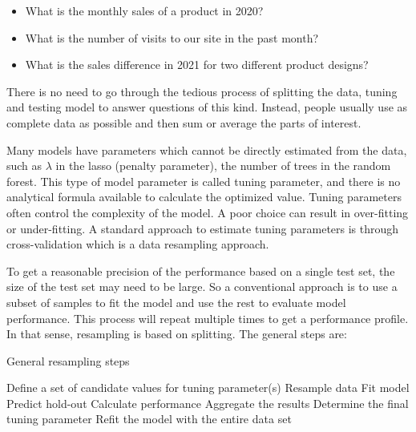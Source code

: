 \documentclass[
  12pt,
]{krantz}
\providecommand{\tightlist}{%
  \setlength{\itemsep}{0pt}\setlength{\parskip}{0pt}}
\begin{document}
\begin{itemize}
\tightlist
\item
  What is the monthly sales of a product in 2020?
\item
  What is the number of visits to our site in the past month?
\item
  What is the sales difference in 2021 for two different product designs?
\end{itemize}

There is no need to go through the tedious process of splitting the data, tuning and testing model to answer questions of this kind. Instead, people usually use as complete data as possible and then sum or average the parts of interest.

Many models have parameters which cannot be directly estimated from the data, such as \(\lambda\) in the lasso (penalty parameter), the number of trees in the random forest. This type of model parameter is called tuning parameter, and there is no analytical formula available to calculate the optimized value. Tuning parameters often control the complexity of the model. A poor choice can result in over-fitting or under-fitting. A standard approach to estimate tuning parameters is through cross-validation which is a data resampling approach.

To get a reasonable precision of the performance based on a single test set, the size of the test set may need to be large. So a conventional approach is to use a subset of samples to fit the model and use the rest to evaluate model performance. This process will repeat multiple times to get a performance profile. In that sense, resampling is based on splitting. The general steps are:

\begin{algorithm}
\caption{General resampling steps}\label{resampling} 
\begin{algorithmic}[1] 
\State Define a set of candidate values for tuning parameter(s)
        \State Resample data
        \State Fit model
        \State Predict hold-out
        \State Calculate performance
    \EndFor
\State Aggregate the results
\State Determine the final tuning parameter
\State Refit the model with the entire data set
\end{algorithmic}
\end{algorithm}
\end{document}
